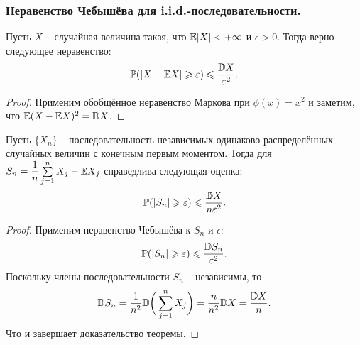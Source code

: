 \subsubsection{Неравенство Чебышёва для i.i.d.-последовательности.}
\begin{theorem}
    Пусть $X$ -- случайная величина такая, что $\mathbb{E} |X| < +\infty$ и $\epsilon > 0$. Тогда верно следующее неравенство:
    \[
        \mathbb{P}(|X - \mathbb{E} X| \geqslant \varepsilon) \leqslant \dfrac{\mathbb{D} X}{\varepsilon^2}.
    \]
\end{theorem}
\begin{proof}
    Применим обобщённое неравенство Маркова при $\phi(x) = x^2$ и заметим, что $\mathbb{E}(X - \mathbb{E} X)^2 = \mathbb{D} X$.
\end{proof}
\begin{corollary}
    Пусть $\{X_n\}$ -- последовательность независимых одинаково распределённых случайных величин с конечным первым моментом. Тогда для $S_n = \dfrac{1}{n}\sum\limits_{j = 1}^n X_j - \mathbb{E} X_j$ справедлива следующая оценка:
    \[
        \mathbb{P}(|S_n| \geqslant \varepsilon) \leqslant \dfrac{\mathbb{D} X}{n\varepsilon^2}.
    \]
\end{corollary}
\begin{proof}
    Применим неравенство Чебышёва к $S_n$ и $\epsilon$:
    \[
        \mathbb{P}(|S_n| \geqslant \varepsilon) \leqslant \dfrac{\mathbb{D} S_n}{\varepsilon^2}.
    \]
    Поскольку члены последовательности $S_n$ -- независимы, то 
    \[
        \mathbb{D} S_n = \dfrac{1}{n^2}\mathbb{D}\biggr(\sum\limits_{j = 1}^n X_j\biggr) = \dfrac{n}{n^2}\mathbb{D} X = \dfrac{\mathbb{D} X}{n}.
    \]
    Что и завершает доказательство теоремы.
\end{proof}
